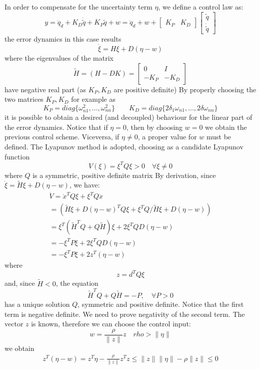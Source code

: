 \documentclass{book}
\begin{document}
In order to compensate for the uncertainty term $\eta$, we define a control law as:
\[
    y = \ddot{q}_d +K_D\dot{\tilde{q}} + K_P\tilde{q}+w = \ddot{q}_d + w + \begin{bmatrix}
        K_P & K_D
    \end{bmatrix} \begin{bmatrix}
    \tilde{q} \\ \dot{\tilde{q}}
    \end{bmatrix}
\]
the error dynamics in this case results
\[
    \dot{\xi} = H \xi + D(\eta-w)
\]
where the eigenvalues of the matrix
\[
    \tilde{H}= (H-DK) = \begin{bmatrix}
        0 & I \\ -K_P & -K_D
    \end{bmatrix}
\]
have negative real part (as $K_P,K_D$ are positive definite)
By properly choosing the two matrices $K_P,K_D$ for example as 
\[
    K_P = diag\{\omega_{n1}^2,\dots,\omega_{nn}^2\} \qquad K_D = diag\{2\delta_1\omega_{n1},\dots,2\delta\omega_{nn}\} 
\]
it is possible to obtain a desired (and decoupled) behaviour for the linear part of the error dynamics. Notice that if $\eta=0$, then by choosing $w=0$ we obtain the previous control scheme. Viceversa, if $\eta\neq 0$, a proper value for $w$ must be defined. The Lyapunov method is adopted, choosing as a candidate Lyapunov function
\[
    V(\xi)=\xi^TQ\xi>0 \quad \forall \xi \neq 0
\]
where $Q$ is a symmetric, positive definite matrix
By derivation, since $\dot{\xi}=\tilde{H}\xi+D(\eta-w)$, we have:
\begin{gather*}
    \dot{V} = \dot{x}^TQ\xi+\xi^TQ\dot{x}\\
    =(\tilde{H}\xi+D(\eta-w)^TQ\xi+\xi^TQ/\tilde{H}\xi+D(\eta-w))\\
    =\xi^T(\tilde{H}^TQ+Q\tilde{H})\xi+2\xi^TQD(\eta-w)\\
    =-\xi^TP\xi+2\xi^TQD(\eta-w)\\
    =-\xi^TP\xi+2z^T(\eta-w)
\end{gather*}
where\[
    z=d^TQ\xi
\]
and, since $\tilde{H}<0$, the equation 
\[
    \tilde{H}^TQ+Q\tilde{H}=-P, \quad \forall P>0
\]
has a unique solution $Q$, symmetric and positive definite. 
Notice that the first term is negative definite. We need to prove negativity of the second term. The vector $z$ is known, therefore we can choose the control input:
\[
    w=\displaystyle\frac{\rho}{\|z\|}z \quad rho>\|\eta\|
\]
we obtain
\begin{gather*}
    z^T(\eta-w)=z^T\eta-\displaystyle\frac{\rho}{\|z\|}z^Tz \leq \|z\|\|\eta\|-\rho\|z\| \leq 0
\end{gather*}
\end{document}
